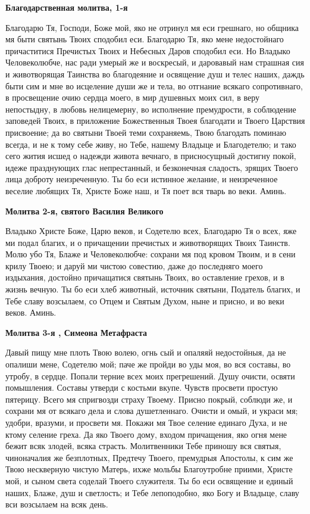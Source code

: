 \bfseries Благодарственная молитва, 1-я\normalfont{}


Благодарю Тя, Господи, Боже мой, яко не отринул мя еси грешнаго, но общника мя быти святынь Твоих сподобил еси. Благодарю Тя, яко мене недостойнаго причаститися Пречистых Твоих и Небесных Даров сподобил еси. Но Владыко Человеколюбче, нас ради умерый же и воскресый, и даровавый нам страшная сия и животворящая Таинства во благодеяние и освящение душ и телес наших, даждь быти сим и мне во исцеление души же и тела, во отгнание всякаго сопротивнаго, в просвещение очию сердца моего, в мир душевных моих сил, в веру непостыдну, в любовь нелицемерну, во исполнение премудрости, в соблюдение заповедей Твоих, в приложение Божественныя Твоея благодати и Твоего Царствия присвоение; да во святыни Твоей теми сохраняемь, Твою благодать поминаю всегда, и не к тому себе живу, но Тебе, нашему Владыце и Благодетелю; и тако сего жития исшед о надежди живота вечнаго, в присносущный достигну покой, идеже празднующих глас непрестанный, и безконечная сладость, зрящих Твоего лица доброту неизреченную. Ты бо еси истинное желание, и неизреченное веселие любящих Тя, Христе Боже наш, и Тя поет вся тварь во веки. Аминь.




\bfseries Молитва 2-я, святого Василия Великого\normalfont{}


Владыко Христе Боже, Царю веков, и Содетелю всех, Благодарю Тя о всех, яже ми подал благих, и о причащении пречистых и животворящих Твоих Таинств. Молю убо Тя, Блаже и Человеколюбче: сохрани мя под кровом Твоим, и в сени крилу Твоею; и даруй ми чистою совестию, даже до последняго моего издыхания, достойно причащатися святынь Твоих, во оставление грехов, и в жизнь вечную. Ты бо еси хлеб животный, источник святыни, Податель благих, и Тебе славу возсылаем, со Отцем и Святым Духом, ныне и присно, и во веки веков. Аминь.




\bfseries Молитва 3-я , Симеона Метафраста\normalfont{}


Давый пищу мне плоть Твою волею, огнь сый и опаляяй недостойныя, да не опалиши мене, Содетелю мой; паче же пройди во уды моя, во вся составы, во утробу, в сердце. Попали терние всех моих прегрешений. Душу очисти, освяти помышления. Составы утверди с костьми вкупе. Чувств просвети простую пятерицу. Всего мя спригвозди страху Твоему. Присно покрый, соблюди же, и сохрани мя от всякаго дела и слова душетленнаго. Очисти и омый, и украси мя; удобри, вразуми, и просвети мя. Покажи мя Твое селение единаго Духа, и не ктому селение греха. Да яко Твоего дому, входом причащения, яко огня мене бежит всяк злодей, всяка страсть. Молитвенники Тебе приношу вся святыя, чиноначалия же безплотных, Предтечу Твоего, премудрыя Апостолы, к сим же Твою нескверную чистую Матерь, ихже мольбы Благоутробне приими, Христе мой, и сыном света соделай Твоего служителя. Ты бо еси освящение и единый наших, Блаже, душ и светлость; и Тебе лепоподобно, яко Богу и Владыце, славу вси возсылаем на всяк день.





